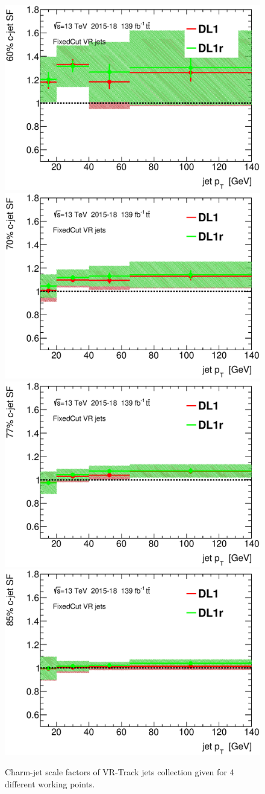 \documentclass[letterpaper,12pt]{article}
\begin{document}
\begin{figure}[H]
\includegraphics[width=.45\textwidth]{SFplots_december/DL1allVRJetsDec_DL1rallVRJetsDec/SF60.eps}
\includegraphics[width=.45\textwidth]{SFplots_december/DL1allVRJetsDec_DL1rallVRJetsDec/SF70.eps}\\
\includegraphics[width=.45\textwidth]{SFplots_december/DL1allVRJetsDec_DL1rallVRJetsDec/SF77.eps}
\includegraphics[width=.45\textwidth]{SFplots_december/DL1allVRJetsDec_DL1rallVRJetsDec/SF85.eps}\\
\caption{Charm-jet scale factors of VR-Track jets collection 
given for 4 different working points.} \label{fig:Dec_SF_VRJets}
\end{figure}


\end{document}
